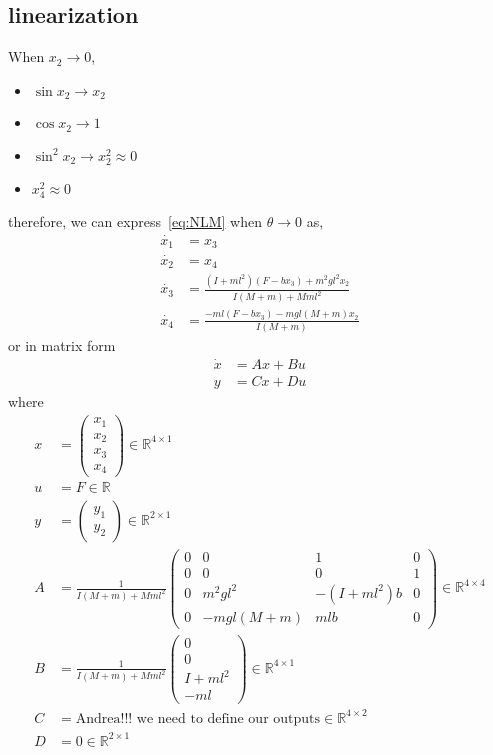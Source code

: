 \documentclass{ieeeaccess}
\begin{document}
\subsection{linearization}
When $x_2 \to 0$,
\begin{itemize}
  \item $\sin{x_2} \to x_2$
  \item $\cos{x_2} \to 1$
  \item $\sin^2{x_2} \to x_2^2 \approx 0$
  \item $x_4^2 \approx 0$
\end{itemize}
therefore, we can express~\ref{eq:NLM} when $\theta \to 0$ as,
\begin{equation}
  \label{eq:LME}
  \begin{aligned}
    \dot{x_1} &= x_3 \\
    \dot{x_2} &= x_4 \\
    \dot{x_3} &= \frac{(I + ml^2)(F - bx_3) + m^2gl^2x_2}{I(M + m) + Mml^2} \\
    \dot{x_4} &= \frac{-ml(F - bx_3) - mgl(M + m)x_2}{I(M + m)}
  \end{aligned}
\end{equation}
or in matrix form
\begin{equation}
  \label{eq:LM}
  \begin{aligned}
    \dot{x} &= Ax + Bu \\
    y       &= Cx + Du
  \end{aligned}
\end{equation}
where
\begin{align*}
  x &= \begin{pmatrix} x_1 \\ x_2 \\ x_3 \\ x_4 \end{pmatrix} \in \mathbb{R}^{4 \times 1} \\
  u &= F \in \mathbb{R} \\
  y &= \begin{pmatrix} y_1 \\ y_2 \end{pmatrix} \in \mathbb{R}^{2 \times 1} \\
  A &= \frac{1}{I(M + m) + Mml^2} \begin{pmatrix}
    0 & 0 & 1 & 0 \\
    0 & 0 & 0 & 1 \\
    0 & m^2gl^2 & -(I + ml^2)b & 0 \\
    0 & -mgl(M + m) & mlb & 0
  \end{pmatrix} \in \mathbb{R}^{4 \times 4} \\
  B &= \frac{1}{I(M + m) + Mml^2} \begin{pmatrix}
    0 \\ 0 \\ I + ml^2 \\ -ml
  \end{pmatrix} \in \mathbb{R}^{4 \times 1} \\
  C &= \text{Andrea!!! we need to define our outputs}  \in \mathbb{R}^{4 \times 2} \\
  D &= 0 \in \mathbb{R}^{2 \times 1}
\end{align*}
\EOD{}
\end{document}
